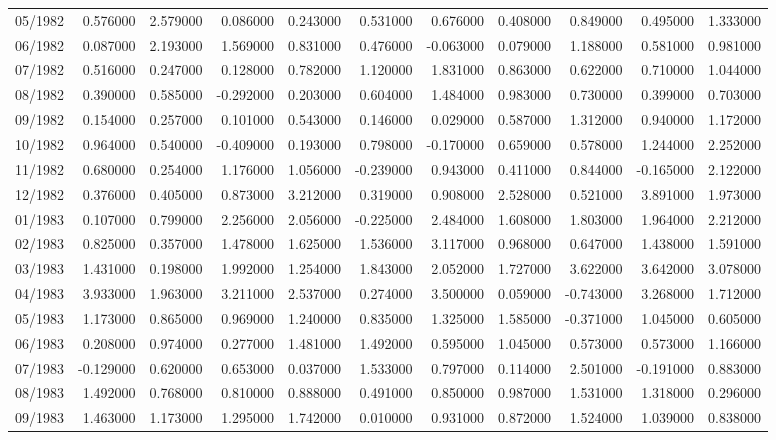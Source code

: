 \begin{tabular}{lrrrrrrrrrr}
05/1982 & 0.576000 & 2.579000 & 0.086000 & 0.243000 & 0.531000 & 0.676000 & 0.408000 & 0.849000 & 0.495000 & 1.333000 \\
06/1982 & 0.087000 & 2.193000 & 1.569000 & 0.831000 & 0.476000 & -0.063000 & 0.079000 & 1.188000 & 0.581000 & 0.981000 \\
07/1982 & 0.516000 & 0.247000 & 0.128000 & 0.782000 & 1.120000 & 1.831000 & 0.863000 & 0.622000 & 0.710000 & 1.044000 \\
08/1982 & 0.390000 & 0.585000 & -0.292000 & 0.203000 & 0.604000 & 1.484000 & 0.983000 & 0.730000 & 0.399000 & 0.703000 \\
09/1982 & 0.154000 & 0.257000 & 0.101000 & 0.543000 & 0.146000 & 0.029000 & 0.587000 & 1.312000 & 0.940000 & 1.172000 \\
10/1982 & 0.964000 & 0.540000 & -0.409000 & 0.193000 & 0.798000 & -0.170000 & 0.659000 & 0.578000 & 1.244000 & 2.252000 \\
11/1982 & 0.680000 & 0.254000 & 1.176000 & 1.056000 & -0.239000 & 0.943000 & 0.411000 & 0.844000 & -0.165000 & 2.122000 \\
12/1982 & 0.376000 & 0.405000 & 0.873000 & 3.212000 & 0.319000 & 0.908000 & 2.528000 & 0.521000 & 3.891000 & 1.973000 \\
01/1983 & 0.107000 & 0.799000 & 2.256000 & 2.056000 & -0.225000 & 2.484000 & 1.608000 & 1.803000 & 1.964000 & 2.212000 \\
02/1983 & 0.825000 & 0.357000 & 1.478000 & 1.625000 & 1.536000 & 3.117000 & 0.968000 & 0.647000 & 1.438000 & 1.591000 \\
03/1983 & 1.431000 & 0.198000 & 1.992000 & 1.254000 & 1.843000 & 2.052000 & 1.727000 & 3.622000 & 3.642000 & 3.078000 \\
04/1983 & 3.933000 & 1.963000 & 3.211000 & 2.537000 & 0.274000 & 3.500000 & 0.059000 & -0.743000 & 3.268000 & 1.712000 \\
05/1983 & 1.173000 & 0.865000 & 0.969000 & 1.240000 & 0.835000 & 1.325000 & 1.585000 & -0.371000 & 1.045000 & 0.605000 \\
06/1983 & 0.208000 & 0.974000 & 0.277000 & 1.481000 & 1.492000 & 0.595000 & 1.045000 & 0.573000 & 0.573000 & 1.166000 \\
07/1983 & -0.129000 & 0.620000 & 0.653000 & 0.037000 & 1.533000 & 0.797000 & 0.114000 & 2.501000 & -0.191000 & 0.883000 \\
08/1983 & 1.492000 & 0.768000 & 0.810000 & 0.888000 & 0.491000 & 0.850000 & 0.987000 & 1.531000 & 1.318000 & 0.296000 \\
09/1983 & 1.463000 & 1.173000 & 1.295000 & 1.742000 & 0.010000 & 0.931000 & 0.872000 & 1.524000 & 1.039000 & 0.838000 \\

\end{tabular}
